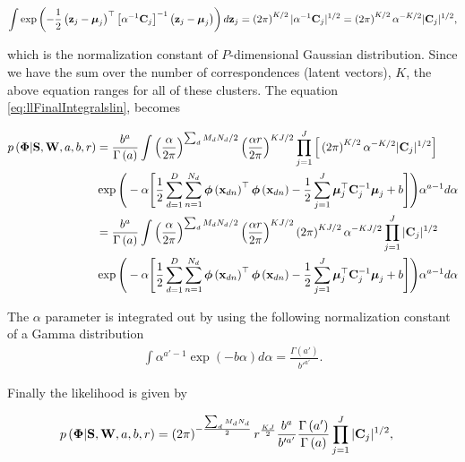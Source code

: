 	\begin{align}
	\int \exp\left(-\frac{1}{2}\left(\mathbf{z}_j-\boldsymbol{\mu}_j\right)^\top\left[\alpha^{-1}\mathbf{C}_j\right]^{-1}\left(\mathbf{z}_j-\boldsymbol{\mu}_j\right)\right)d\mathbf{z}_j = \left(2\pi\right)^{K/2}|\alpha^{-1}\mathbf{C}_j|^{1/2} = \left(2\pi\right)^{K/2}\alpha^{-K/2}|\mathbf{C}_j|^{1/2},
	\end{align}
	
	which is the normalization constant of $P$-dimensional Gaussian distribution. Since we have the sum over the number of correspondences (latent vectors), $K$, the above equation ranges for all of these clusters. The equation \eqref{eq:llFinalIntegralslin}, becomes
	
	\begin{align}
	p\left(\boldsymbol{\Phi}|\mathbf{S},\mathbf{W},a,b,r\right) &=\frac{b^a}{\Gamma\left(a\right)}\int \left(\frac{\alpha}{2\pi}\right)^{\sum_d M_d N_d /2}\left(\frac{\alpha r}{2\pi}\right)^{KJ/2} \prod_{j=1}^{J}\Big[\left(2\pi\right)^{K/2}\alpha^{-K/2}|\mathbf{C}_j|^{1/2}\Big]
	\notag\\
	&\exp\Bigg(-\alpha\Bigg[\frac{1}{2} \sum_{d=1}^{D}\sum_{n=1}^{N_d}\boldsymbol{\phi}\left(\mathbf{x}_{dn}\right)^\top \boldsymbol{\phi}\left(\mathbf{x}_{dn}\right) -\frac{1}{2}\sum_{j=1}^{J}\boldsymbol{\mu}_j^\top\mathbf{C}_j^{-1}\boldsymbol{\mu}_j +b \Bigg]\Bigg)\alpha^{a-1}d\alpha \\
	&=\frac{b^a}{\Gamma\left(a\right)}\int \left(\frac{\alpha}{2\pi}\right)^{\sum_d M_d N_d /2}\left(\frac{\alpha r}{2\pi}\right)^{KJ/2} \left(2\pi\right)^{KJ/2}\alpha^{-KJ/2}\prod_{j=1}^{J}|\mathbf{C}_j|^{1/2} \notag\\
	&\exp\Bigg(-\alpha\Bigg[\frac{1}{2} \sum_{d=1}^{D}\sum_{n=1}^{N_d}\boldsymbol{\phi}\left(\mathbf{x}_{dn}\right)^\top\boldsymbol{\phi}\left(\mathbf{x}_{dn}\right) -\frac{1}{2}\sum_{j=1}^{J}\boldsymbol{\mu}_j^\top\mathbf{C}_j^{-1}\boldsymbol{\mu}_j +b \Bigg]\Bigg)\alpha^{a-1}d\alpha\label{eq:llFinalIntegralZlinf}
	\end{align}
	
	The $\alpha$ parameter is integrated out by using the following normalization constant of a Gamma distribution 
	\begin{align}
	\int \alpha^{a'-1}\exp\left(-b\alpha\right)d\alpha = \frac{\Gamma\left(a'\right)}{b'^{a'}}.
	\end{align}
	
	Finally the likelihood is given by
	
	\begin{align}
	p\left(\boldsymbol{\Phi}|\mathbf{S},\mathbf{W},a,b,r\right) &=\left(2\pi\right)^{-\frac{\sum_d M_d N_d}{2}}r^{\frac{KJ}{2}}\frac{b^{a}}{b'^{a'}}\frac{\Gamma\left(a'\right)}{\Gamma\left(a\right)}\prod_{j=1}^{J}|\mathbf{C}_j|^{1/2},
	\label{eq:llFinalIntegrallastlinf}
	\end{align}
	
